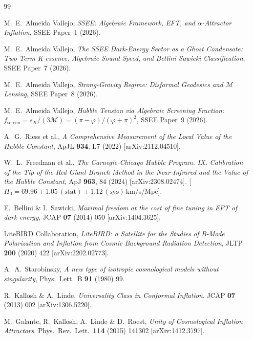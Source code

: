\documentclass[12pt,a4paper]{article}
\newcommand{\phiG}{\varphi}
\newcommand{\MIRA}{\mathcal{M}}
\newcommand{\fsc}{f_{\mathrm{screen}}}
\newcommand{\sK}{s_K}
\begin{document}
\clearpage

\begin{thebibliography}{99}

M.~E.~Almeida Vallejo,
\emph{SSEE: Algebraic Framework, EFT, and $\alpha$-Attractor Inflation},
SSEE Paper~1 (2026).

M.~E.~Almeida Vallejo,
\emph{The SSEE Dark-Energy Sector as a Ghost Condensate: Two-Term K-essence,
Algebraic Sound Speed, and Bellini-Sawicki Classification},
SSEE Paper~7 (2026).

M.~E.~Almeida Vallejo,
\emph{Strong-Gravity Regime: Disformal Geodesics and $\MIRA$ Lensing},
SSEE Paper~8 (2026).

M.~E.~Almeida Vallejo,
\emph{Hubble Tension via Algebraic Screening Fraction:
$\fsc = \sK/(3\MIRA) = (\pi-\phiG)/(\phiG+\pi)^2$},
SSEE Paper~9 (2026).

A.~G.~Riess et al.,
\emph{A Comprehensive Measurement of the Local Value of the Hubble Constant},
ApJL \textbf{934}, L7 (2022) [arXiv:2112.04510].

W.~L.~Freedman et al.,
\emph{The Carnegie-Chicago Hubble Program. IX. Calibration of the Tip of the Red Giant
Branch Method in the Near-Infrared and the Value of the Hubble Constant},
ApJ \textbf{963}, 84 (2024) [arXiv:2308.02474].
[$H_0 = 69.96\pm1.05\,(\mathrm{stat})\pm1.12\,(\mathrm{sys})$\,km/s/Mpc].

E.~Bellini \& I.~Sawicki,
\emph{Maximal freedom at the cost of fine tuning in EFT of dark energy},
JCAP \textbf{07} (2014) 050 [arXiv:1404.3625].

LiteBIRD Collaboration,
\emph{LiteBIRD: a Satellite for the Studies of B-Mode Polarization and
Inflation from Cosmic Background Radiation Detection},
JLTP \textbf{200} (2020) 422 [arXiv:2202.02773].

A.~A.~Starobinsky,
\emph{A new type of isotropic cosmological models without singularity},
Phys.\ Lett.\ B \textbf{91} (1980) 99.

R.~Kallosh \& A.~Linde,
\emph{Universality Class in Conformal Inflation},
JCAP \textbf{07} (2013) 002 [arXiv:1306.5220].

M.~Galante, R.~Kallosh, A.~Linde \& D.~Roest,
\emph{Unity of Cosmological Inflation Attractors},
Phys.\ Rev.\ Lett.\ \textbf{114} (2015) 141302 [arXiv:1412.3797].


\end{thebibliography}
\end{document}
